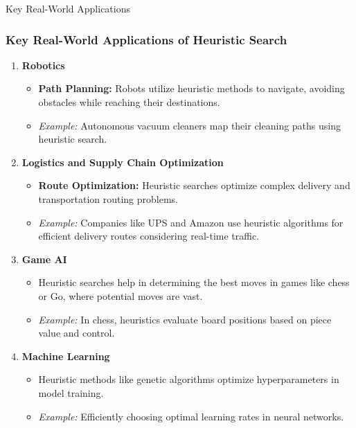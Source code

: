 \documentclass[aspectratio=169]{beamer}
\begin{document}
\begin{frame}[fragile]{Key Real-World Applications}
    \frametitle{Key Real-World Applications of Heuristic Search}
    \begin{enumerate}
        \item \textbf{Robotics}
            \begin{itemize}
                \item \textbf{Path Planning:} Robots utilize heuristic methods to navigate, avoiding obstacles while reaching their destinations.
                \item \textit{Example:} Autonomous vacuum cleaners map their cleaning paths using heuristic search.
            \end{itemize}

        \item \textbf{Logistics and Supply Chain Optimization}
            \begin{itemize}
                \item \textbf{Route Optimization:} Heuristic searches optimize complex delivery and transportation routing problems.
                \item \textit{Example:} Companies like UPS and Amazon use heuristic algorithms for efficient delivery routes considering real-time traffic.
            \end{itemize}
    
        \item \textbf{Game AI}
            \begin{itemize}
                \item Heuristic searches help in determining the best moves in games like chess or Go, where potential moves are vast.
                \item \textit{Example:} In chess, heuristics evaluate board positions based on piece value and control.
            \end{itemize}
    
        \item \textbf{Machine Learning}
            \begin{itemize}
                \item Heuristic methods like genetic algorithms optimize hyperparameters in model training.
                \item \textit{Example:} Efficiently choosing optimal learning rates in neural networks.
            \end{itemize}
    \end{enumerate}
\end{frame}
\end{document}
